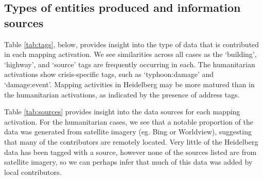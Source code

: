 \subsection{Types of entities produced and information sources}

Table \ref{tab:tags}, below, provides insight into the type of data that is contributed in each mapping activation. We see similarities across all cases as the ‘building’, ‘highway’, and ‘source’ tags are frequently occurring in each. The humanitarian activations show crisis-specific tags, such as ‘typhoon:damage’ and ‘damage:event’. Mapping activities in Heidelberg may be more matured than in the humanitarian activations, as indicated by the presence of address tags. 

Table \ref{tab:sources} provides insight into the data sources for each mapping activation. For the humanitarian cases, we see that a notable proportion of the data was generated from satellite imagery (eg. Bing or Worldview), suggesting that many of the contributors are remotely located. Very little of the Heidelberg data has been tagged with a source, however none of the sources listed are from satellite imagery, so we can perhaps infer that much of this data was added by local contributors. 

